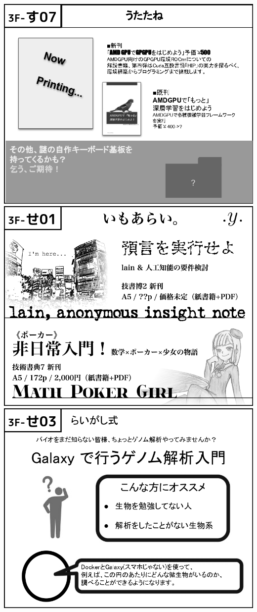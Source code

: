 \begin{center}
\includegraphics[width=0.9\linewidth]{images/circle-appeals/3F-す07.jpg}
\includegraphics[width=0.9\linewidth]{images/circle-appeals/3F-せ01.jpg}
\includegraphics[width=0.9\linewidth]{images/circle-appeals/3F-せ03.jpg}

\end{center}
